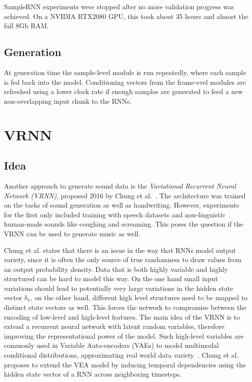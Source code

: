 \documentclass[12pt]{article}
\begin{document}
SampleRNN experiments were stopped after no more validation progress was achieved.
On a NVIDIA RTX2080 GPU, this took about 35 hours and almost the full 8Gb RAM.




\subsection{Generation}
At generation time the sample-level module is run repeatedly, where each sample is fed back into the model.
Conditioning vectors from the frame-evel modules are refreshed using a lower clock rate if enough samples are generated to feed a new non-overlapping input chunk to the RNNs.





\section{VRNN}
\subsection{Idea}
Another approach to generate sound data is the \emph{Variational Recurrent Neural Network (VRNN)}, proposed 2016 by Chung et al.~\cite{chung2015recurrent}.
The architecture was trained on the tasks of sound generation as well as handwriting.
However, experiments for the first only included training with speech datasets and non-linguistic human-made sounds like coughing and screaming.
This poses the question if the VRNN can be used to generate music as well.

Chung et al. states that there is an issue in the way that RNNs model output variety, since it is often the only source of true randomness to draw values from an output probability density.
Data that is both highly variable and highly structured can be hard to model this way.
On the one hand small input variations should lead to potentially very large variations in the hidden state vector $h_t$, on the other hand, different high level structures need to be mapped to distinct state vectors as well.
This forces the network to compromise between the encoding of low-level and high-level features.
The main idea of the VRNN is to extend a recurrent neural network with latent random variables, therefore improving the representational power of the model.
Such high-level variables are commonly used in Variable Auto-encoders (VAEs) to model multimodal conditional distributions, approximating real world data variety~\cite{kingma2013auto}.
Chung et al. proposes to extend the VEA model by inducing temporal dependencies using the hidden state vector of a RNN across neighboring timesteps.
\end{document}
